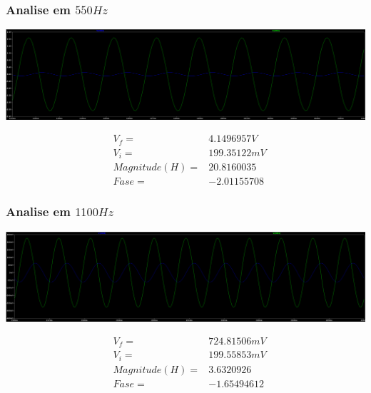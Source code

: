 \documentclass[12pt,twoside, a4paper, twocolumn]{article}
\begin{document}
\subsubsection{Analise em $550Hz$}

\begin{adjustbox}{scale=0.09}
    \includegraphics{ltfreq550.png}
\end{adjustbox}

\begin{equation*}
    \begin{aligned}
         & V_f =          & 4.1496957V  \\
         & V_i =          & 199.35122mV \\
         & Magnitude(H) = & 20.8160035  \\
         & Fase =         & -2.01155708
    \end{aligned}
\end{equation*}

\subsubsection{Analise em $1100Hz$}

\begin{adjustbox}{scale=0.09}
    \includegraphics{ltfreq1100.png}
\end{adjustbox}

\begin{equation*}
    \begin{aligned}
         & V_f =          & 724.81506mV \\
         & V_i =          & 199.55853mV \\
         & Magnitude(H) = & 3.6320926   \\
         & Fase =         & -1.65494612
    \end{aligned}
\end{equation*}
\end{document}

